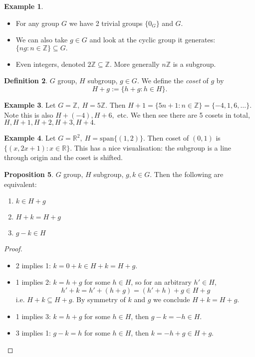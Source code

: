 \documentclass[a4paper]{article}
\newcommand{\spanset}{\text{span}}
\theoremstyle{definition}
\newtheorem{defn}{Definition}[subsection]
\newtheorem{prop}[defn]{Proposition}
\newtheorem{example}[defn]{Example}
\begin{document}
\begin{example}
\begin{itemize}
    \item For any group $G$ we have 2 trivial groups $\{0_G\}$ and $G$.
    \item We can also take $g\in G$ and look at the cyclic group it generates: $\{ng : n\in \mathbb Z \} \subseteq G.$
    \item Even integers, denoted $2\mathbb Z\subseteq \mathbb Z$. More generally $n\mathbb Z$ is a subgroup.
\end{itemize}
\end{example}

\begin{defn}
$G$ group, $H$ subgroup, $g\in G$. We define the \textit{coset} of $g$ by
\[
H+g := \{ h+g : h\in H\} .
\]
\end{defn}
\begin{example}
Let $G=\mathbb Z,\ H=5\mathbb Z$. Then $H+1=\{5n+1 :n\in \mathbb Z\}=\{-4,1,6,\ldots\}$. Note this is also $H+(-4),H+6,$ etc. We then see there are 5 cosets in total, $H,H+1,H+2,H+3,H+4.$
\end{example}
\begin{example}
Let $G=\mathbb R^2,\ H=\spanset \{(1,2)\}$. Then coset of $(0,1)$ is $\{(x,2x+1):x\in \mathbb R\}$. This has a nice visualisation: the subgroup is a line through origin and the coset is shifted.
\end{example}
\begin{prop}
$G$ group, $H$ subgroup, $g,k\in G$. Then the following are equivalent:
\begin{enumerate}
    \item $k\in H+g$
    \item $H+k=H+g$
    \item $g-k \in H$
\end{enumerate}
\end{prop}
\begin{proof}
\begin{itemize}
    \item 2 implies 1: $k=0+k\in H+k=H+g$.
    \item 1 implies 2: $k=h+g$ for some $h\in H$, so for an arbitrary $h'\in H$,
    \[
    h'+k=h'+(h+g)=(h'+h)+g \in H+g
    \]
    i.e. $H+k \subseteq H+g$. By symmetry of $k$ and $g$ we conclude $H+k=H+g.$
    \item 1 implies 3: $k=h+g$ for some $h\in H$, then $g-k=-h\in H$.
    \item 3 implies 1: $g-k=h$ for some $h\in H$, then $k=-h+g\in H+g$.
\end{itemize}
\end{proof}
\end{document}
